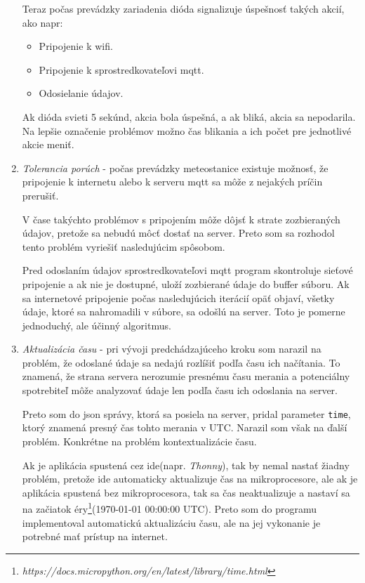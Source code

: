 \begin{enumerate}
    Teraz počas prevádzky zariadenia dióda signalizuje úspešnosť takých akcií, ako napr: 
    \begin{itemize}
        \item Pripojenie k wifi. 
        \item Pripojenie k sprostredkovateľovi \gls{mqtt}.
        \item Odosielanie údajov.
    \end{itemize}
    
    Ak dióda svieti 5 sekúnd, akcia bola úspešná, a ak bliká, akcia sa nepodarila. Na lepšie označenie problémov možno čas blikania a ich počet pre jednotlivé akcie meniť. 
    \item \textit{Tolerancia porúch} - počas prevádzky meteostanice existuje možnosť, že pripojenie k internetu alebo k serveru \gls{mqtt} sa môže z nejakých príčin prerušiť. 
    
    V čase takýchto problémov s pripojením môže dôjsť k strate zozbieraných údajov, pretože sa nebudú môcť dostať na server. Preto som sa rozhodol tento problém vyriešiť nasledujúcim spôsobom. 
    
    Pred odoslaním údajov sprostredkovateľovi \gls{mqtt} program skontroluje sieťové pripojenie a ak nie je dostupné, uloží zozbierané údaje do buffer súboru. Ak sa internetové pripojenie počas nasledujúcich iterácií opäť objaví, všetky údaje, ktoré sa nahromadili v súbore, sa odošlú na server. Toto je pomerne jednoduchý, ale účinný algoritmus.
    \item \textit{Aktualizácia času} - pri vývoji predchádzajúceho kroku som narazil na problém, že odoslané údaje sa nedajú rozlíšiť podľa času ich načítania. To znamená, že strana servera nerozumie presnému času merania a potenciálny spotrebiteľ môže analyzovať údaje len podľa času ich odoslania na server. 
    
    Preto som do \gls{json} správy, ktorá sa posiela na server, pridal parameter \verb|time|, ktorý znamená presný čas tohto merania v UTC.  Narazil som však na ďalší problém. Konkrétne na problém kontextualizácie času. 
    
    Ak je aplikácia spustená cez \gls{ide}(napr. \textit{Thonny}), tak by nemal nastať žiadny problém, pretože \gls{ide} automaticky aktualizuje čas na mikroprocesore, ale ak je aplikácia spustená bez mikroprocesora, tak sa čas neaktualizuje a nastaví sa na začiatok éry\footnote{\textit{https://docs.micropython.org/en/latest/library/time.html}}(1970-01-01 00:00:00 UTC). Preto som do programu implementoval automatickú aktualizáciu času, ale na jej vykonanie je potrebné mať prístup na internet. 
\end{enumerate}
